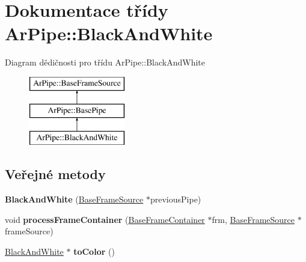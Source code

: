 \hypertarget{class_ar_pipe_1_1_black_and_white}{\section{Dokumentace třídy Ar\-Pipe\-:\-:Black\-And\-White}
\label{df/d31/class_ar_pipe_1_1_black_and_white}
}
Diagram dědičnosti pro třídu Ar\-Pipe\-:\-:Black\-And\-White\begin{figure}[H]
\begin{center}
\leavevmode
\includegraphics[height=3.000000cm]{df/d31/class_ar_pipe_1_1_black_and_white}
\end{center}
\end{figure}
\subsection*{Veřejné metody}
\begin{DoxyCompactItemize}
\item 
\hypertarget{class_ar_pipe_1_1_black_and_white_a7750c0842578069a60a29dfbf5c63356}{{\bfseries Black\-And\-White} (\hyperlink{class_ar_pipe_1_1_base_frame_source}{Base\-Frame\-Source} $\ast$previous\-Pipe)}\label{df/d31/class_ar_pipe_1_1_black_and_white_a7750c0842578069a60a29dfbf5c63356}

\item 
\hypertarget{class_ar_pipe_1_1_black_and_white_addb7f527851e0fa51c2bef8285591a62}{void {\bfseries process\-Frame\-Container} (\hyperlink{class_ar_pipe_1_1_base_frame_container}{Base\-Frame\-Container} $\ast$frm, \hyperlink{class_ar_pipe_1_1_base_frame_source}{Base\-Frame\-Source} $\ast$frame\-Source)}\label{df/d31/class_ar_pipe_1_1_black_and_white_addb7f527851e0fa51c2bef8285591a62}

\item 
\hypertarget{class_ar_pipe_1_1_black_and_white_a13a2d7b682bc12a94f12de7ce9b9f9f3}{\hyperlink{class_ar_pipe_1_1_black_and_white}{Black\-And\-White} $\ast$ {\bfseries to\-Color} ()}\label{df/d31/class_ar_pipe_1_1_black_and_white_a13a2d7b682bc12a94f12de7ce9b9f9f3}

\end{DoxyCompactItemize}
